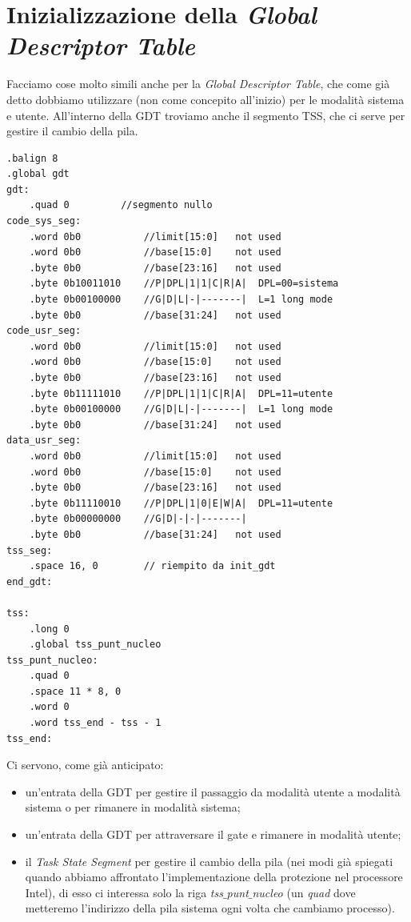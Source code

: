 \documentclass[11pt]{report}
\theoremstyle{definition}
\begin{document}
\section{Inizializzazione della \emph{Global Descriptor Table}}
Facciamo cose molto simili anche per la \emph{Global Descriptor Table}, che come già detto dobbiamo utilizzare (non come concepito all'inizio) per le modalità sistema e utente. All'interno della GDT troviamo anche il segmento TSS, che ci serve per gestire il cambio della pila.
\small 
\begin{verbatim}
.balign 8
.global gdt
gdt:
    .quad 0		    //segmento nullo
code_sys_seg:
    .word 0b0           //limit[15:0]   not used
    .word 0b0           //base[15:0]    not used
    .byte 0b0           //base[23:16]   not used
    .byte 0b10011010    //P|DPL|1|1|C|R|A|  DPL=00=sistema
    .byte 0b00100000    //G|D|L|-|-------|  L=1 long mode
    .byte 0b0           //base[31:24]   not used
code_usr_seg:
    .word 0b0           //limit[15:0]   not used
    .word 0b0           //base[15:0]    not used
    .byte 0b0           //base[23:16]   not used
    .byte 0b11111010    //P|DPL|1|1|C|R|A|  DPL=11=utente
    .byte 0b00100000    //G|D|L|-|-------|  L=1 long mode
    .byte 0b0           //base[31:24]   not used
data_usr_seg:
    .word 0b0           //limit[15:0]   not used
    .word 0b0           //base[15:0]    not used
    .byte 0b0           //base[23:16]   not used
    .byte 0b11110010    //P|DPL|1|0|E|W|A|  DPL=11=utente
    .byte 0b00000000    //G|D|-|-|-------|
    .byte 0b0           //base[31:24]   not used
tss_seg:
    .space 16, 0	    // riempito da init_gdt
end_gdt:

tss:
    .long 0
    .global tss_punt_nucleo
tss_punt_nucleo:
    .quad 0
    .space 11 * 8, 0
    .word 0
    .word tss_end - tss - 1
tss_end:
\end{verbatim}
\normalsize 
Ci servono, come già anticipato:
\begin{itemize}
	\item un'entrata della GDT per gestire il passaggio da modalità utente a modalità sistema o per rimanere in modalità sistema;
	\item un'entrata della GDT per attraversare il gate e rimanere in modalità utente;
	\item il \emph{Task State Segment} per gestire il cambio della pila (nei modi già spiegati quando abbiamo affrontato l'implementazione della protezione nel processore Intel), di esso ci interessa solo la riga \emph{tss$\_$punt$\_$nucleo} (un \emph{quad} dove metteremo l'indirizzo della pila sistema ogni volta che cambiamo processo).
\end{itemize}
\end{document}
